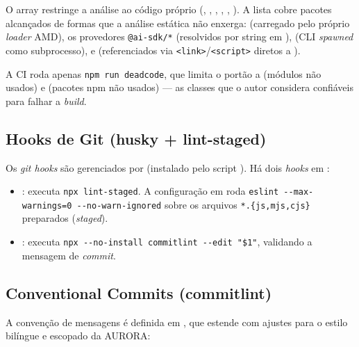 O array  restringe a análise ao código próprio
(, , , ,
, ). A lista
 cobre pacotes alcançados de formas que a análise
estática não enxerga:  (carregado pelo próprio \emph{loader}
AMD), os provedores \lstinline|@ai-sdk/*| (resolvidos por string em
),  (CLI \emph{spawned} como
subprocesso),  e  (referenciados via
\lstinline|<link>|/\lstinline|<script>| diretos a ).

A CI roda apenas \lstinline|npm run deadcode|, que limita o portão a
 (módulos não usados) e  (pacotes npm não usados)
--- as classes que o autor considera confiáveis para falhar a \emph{build}.

\subsection{Hooks de Git (husky + lint-staged)}
\label{sub:18-husky}

Os \emph{git hooks} são gerenciados por  (instalado pelo script
). Há dois \emph{hooks} em :

\begin{itemize}[nosep]
  \item {}: executa \lstinline|npx lint-staged|. A configuração
         em  roda
        \lstinline|eslint --max-warnings=0 --no-warn-ignored| sobre os arquivos
        \lstinline|*.{js,mjs,cjs}| preparados (\emph{staged}).
  \item {}: executa
        \lstinline|npx --no-install commitlint --edit "$1"|, validando a
        mensagem de \emph{commit}.
\end{itemize}

\subsection{Conventional Commits (commitlint)}
\label{sub:18-commitlint}

A convenção de mensagens é definida em , que estende
 com ajustes para o estilo bilíngue e
escopado da AURORA:

